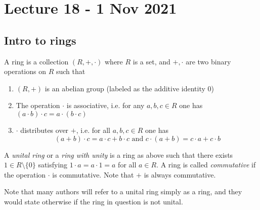 \section{Lecture 18 - 1 Nov 2021}
\subsection{Intro to rings}
\begin{definition}
  A ring is a collection $(R,+,\cdot)$ where $R$ is a set, and $+,\cdot$ are two binary
  operations on $R$ such that 
  \begin{enumerate}
    \item $(R,+)$ is an abelian group (labeled as the additive identity $0$)
    \item The operation $\cdot$ is associative, i.e. for any $a,b,c\in R$ one has
      $(a\cdot b)\cdot c = a\cdot (b\cdot c)$
    \item $\cdot$ distributes over $+$, i.e. for all $a,b,c\in R$ one has 
      \[(a+b)\cdot c = a\cdot c+b\cdot c \text{ and } c\cdot (a+b)=c\cdot a + c\cdot b\]
  \end{enumerate}
  A \emph{unital ring} or a \emph{ring with unity} is a ring as above such that there
  exists $1\in R\setminus \{0\}$ satisfying $1\cdot a = a\cdot 1 = a$ for all $a\in R$.
  A ring is called \emph{commutative} if the operation $\cdot$ is commutative. Note that
  $+$ is always commutative.
  \label{def:ring}
\end{definition}
\begin{remark}
  Note that many authors will refer to a unital ring simply as a ring, and they would
  state otherwise if the ring in question is not unital.
\end{remark}

